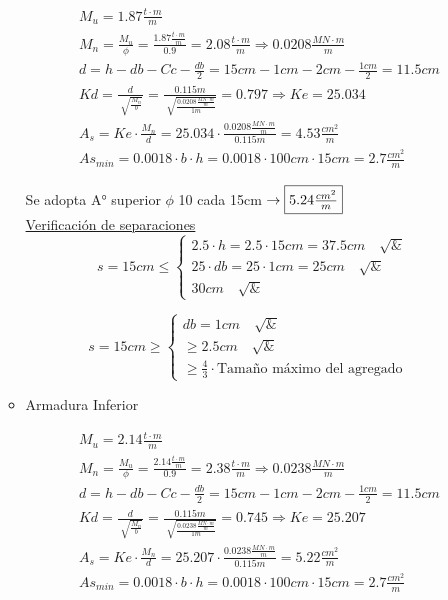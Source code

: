 \begin{enumerate}
\begin{itemize}
\begin{align*}
& M_u = 1.87 \frac{t \cdot m}{m} \\
& M_n = \frac{M_u}{\phi} = \frac{1.87 \frac{t \cdot m}{m}}{0.9} = 2.08 \frac{t \cdot m}{m} \Rightarrow 0.0208 \frac{MN \cdot m}{m} \\
& d = h -db - Cc - \frac{db}{2} = 15cm - 1cm - 2cm - \frac{1cm}{2}= 11.5cm \\
& Kd = \frac{d}{\sqrt[]{\frac{M_n}{b}}} = \frac{0.115m}{\sqrt[]{\frac{0.0208 \frac{MN \cdot m}{m}}{1m}}} = 0.797 \Rightarrow Ke = 25.034 \\
& A_s = Ke \cdot \frac{M_n}{d} = 25.034 \cdot \frac{0.0208 \frac{MN \cdot m}{m}}{0.115m} = 4.53 \frac{cm^2}{m}\\
& As_{min} = 0.0018 \cdot b \cdot h = 0.0018 \cdot 100cm \cdot 15cm = 2.7 \frac{cm^2}{m}
\end{align*}

Se adopta A° superior $\phi$ 10 cada 15cm $\rightarrow \framebox{$5.24 \frac{cm^2}{m}$}$ \\

\underline{Verificación de separaciones}\\

\[ s = 15cm \leq \left\{ \begin{array}{ll}
         2.5 \cdot h = 2.5 \cdot 15cm = 37.5cm \quad \surd & \\
         25 \cdot db = 25 \cdot 1cm = 25cm \quad \surd &\\
         30cm \quad \surd & \end{array} \right. \] 
         
\[ s = 15cm \geq \left\{ \begin{array}{ll}
         db = 1cm \quad \surd & \\
         \geq 2.5cm \quad \surd &\\
         \geq \frac{4}{3} \cdot \text{Tamaño máximo del agregado} & \end{array} \right. \] 

\item Armadura Inferior

\begin{align*}
& M_u = 2.14 \frac{t \cdot m}{m} \\
& M_n = \frac{M_u}{\phi} = \frac{2.14 \frac{t \cdot m}{m}}{0.9} = 2.38 \frac{t \cdot m}{m} \Rightarrow 0.0238 \frac{MN \cdot m}{m} \\
& d = h -db - Cc - \frac{db}{2} = 15cm - 1cm - 2cm - \frac{1cm}{2}= 11.5cm \\
& Kd = \frac{d}{\sqrt[]{\frac{M_n}{b}}} = \frac{0.115m}{\sqrt[]{\frac{0.0238 \frac{MN \cdot m}{m}}{1m}}} = 0.745 \Rightarrow Ke = 25.207 \\
& A_s = Ke \cdot \frac{M_n}{d} = 25.207 \cdot \frac{0.0238 \frac{MN \cdot m}{m}}{0.115m} = 5.22 \frac{cm^2}{m}\\
& As_{min} = 0.0018 \cdot b \cdot h = 0.0018 \cdot 100cm \cdot 15cm = 2.7 \frac{cm^2}{m}
\end{align*}


\end{itemize}
\end{enumerate}
